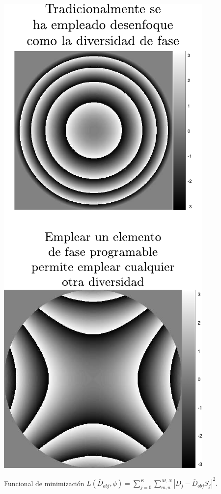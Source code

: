 \documentclass[serif,8pt]{beamer}
\begin{document}
\begin{frame}
\begin{multicols}{2}
		\hspace*{100pt}\includegraphics[scale=0.3]{img/diversidades.pdf}
		
		\end{multicols}		
		
		\vspace{10pt}
		\begin{block}{\centering Funcional de minimización}
			\centering
			$L(\overline{D}_{obj}, \phi) = \sum\limits_{j=0}^K \sum\limits_{m,n}^{M,N} |D_j - \overline{D}_{obj} S_j|^2.$
		\end{block}
		\end{frame}
\end{document}
